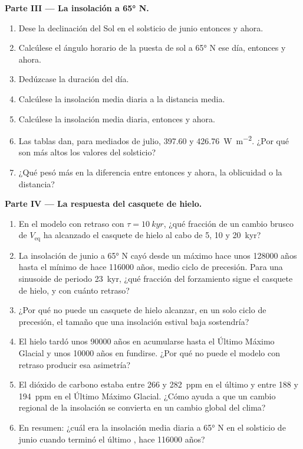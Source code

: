 \begin{problem}
\medskip\noindent\textbf{Parte III --- La insolación a \ang{65} N.}
\begin{enumerate}[resume]
  \item Dese la declinación del Sol en el solsticio de junio entonces y ahora.
  \item Calcúlese el ángulo horario de la puesta de sol a \ang{65} N ese día, entonces y ahora.
  \item Dedúzcase la duración del día.
  \item Calcúlese la insolación media diaria a la distancia media.
  \item Calcúlese la insolación media diaria, entonces y ahora.
  \item Las tablas dan, para mediados de julio, 397.60 y \qty{426.76}{W.m^{-2}}. ¿Por qué son más altos los
        valores del solsticio?
  \item ¿Qué pesó más en la diferencia entre entonces y ahora, la oblicuidad o la distancia?
\end{enumerate}

\medskip\noindent\textbf{Parte IV --- La respuesta del casquete de hielo.}
\begin{enumerate}[resume]
  \item En el modelo con retraso con $\tau = \qty{10}{kyr}$, ¿qué fracción de un cambio brusco de
        $V_{\mathrm{eq}}$ ha alcanzado el casquete de hielo al cabo de 5, 10 y \qty{20}{kyr}?
  \item La insolación de junio a \ang{65} N cayó desde un máximo hace unos \num{128000} años hasta el
        mínimo de hace \num{116000} años, medio ciclo de precesión. Para una sinusoide de periodo
        \qty{23}{kyr}, ¿qué fracción del forzamiento sigue el casquete de hielo, y con cuánto retraso?
  \item ¿Por qué no puede un casquete de hielo alcanzar, en un solo ciclo de precesión, el tamaño que una insolación
        estival baja sostendría?
  \item El hielo tardó unos \num{90000} años en acumularse hasta el Último Máximo Glacial y unos
        \num{10000} años en fundirse. ¿Por qué no puede el modelo con retraso producir esa asimetría?
  \item El dióxido de carbono estaba entre 266 y \qty{282}{ppm} en el último  y entre
        188 y \qty{194}{ppm} en el Último Máximo Glacial. ¿Cómo ayuda a que un cambio regional de la
        insolación se convierta en un cambio global del clima?
  \item En resumen: ¿cuál era la insolación media diaria a \ang{65} N en el solsticio de junio cuando
        terminó el último , hace \num{116000} años?
\end{enumerate}
\end{problem}
